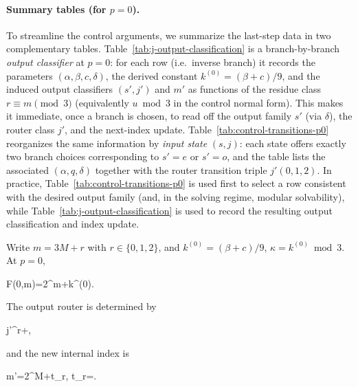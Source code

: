 \documentclass[11pt,letterpaper]{amsart}
\def\[{ }%
\def\]{ }%
\theoremstyle{definition}
\theoremstyle{plain}
\theoremstyle{plain}
\theoremstyle{remark}
\begin{document}
\paragraph{Summary tables (for $p=0$).}
To streamline the control arguments, we summarize the last-step data in two complementary tables.
Table~\ref{tab:j-output-classification} is a branch-by-branch \emph{output classifier} at $p=0$: for each row (i.e.\ inverse branch) it records the parameters $(\alpha,\beta,c,\delta)$, the derived constant $k^{(0)}=(\beta+c)/9$, and the induced output classifiers $(s',j')$ and $m'$ as functions of the residue class $r\equiv m\pmod 3$ (equivalently $u\bmod 3$ in the control normal form).
This makes it immediate, once a branch is chosen, to read off the output family $s'$ (via $\delta$), the router class $j'$, and the next-index update.
Table~\ref{tab:control-transitions-p0} reorganizes the same information by \emph{input state} $(s,j)$: each state offers exactly two branch choices corresponding to $s'=e$ or $s'=o$, and the table lists the associated $(\alpha,q,\delta)$ together with the router transition triple $j'(0,1,2)$.
In practice, Table~\ref{tab:control-transitions-p0} is used first to select a row consistent with the desired output family (and, in the solving regime, modular solvability), while Table~\ref{tab:j-output-classification} is used to record the resulting output classification and index update.

Write $m=3M+r$ with $r\in\{0,1,2\}$, and
$k^{(0)}=(\beta+c)/9$, $\kappa=k^{(0)}\bmod 3$.
At $p=0$,
\[
F(0,m)=2^\alpha m+k^{(0)}.
\]
The output router is determined by
\[
j'^\alpha r+\kappa {},
\]
and the new internal index is
\[
m'=2^\alpha M+t_r,
\qquad
t_r=\left\lfloor{}\right\rfloor.
\]
\end{document}
